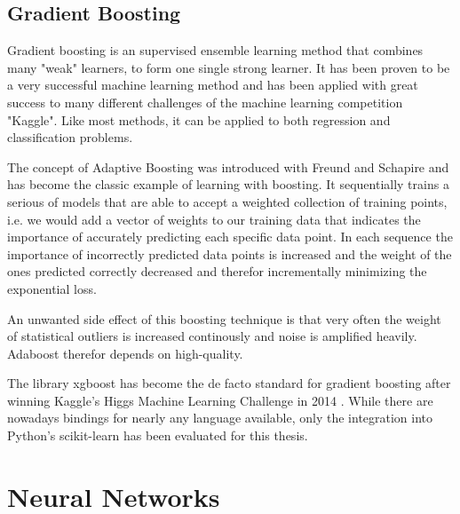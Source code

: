 




\subsection{Gradient Boosting}

Gradient boosting is an supervised ensemble learning method that combines many "weak" learners, to form one single strong learner.  It has been proven to be a very successful machine learning method and has been applied with great success to many different challenges of the machine learning competition "Kaggle". Like most methods, it can be applied to both regression and classification problems.

The concept of Adaptive Boosting was introduced with \cite{Freund97adecision-theoretic} Freund and Schapire and has become the classic example of learning with boosting. It sequentially trains a serious of models that are able to accept a weighted collection of training points, i.e. we would add a vector of weights to our training data that indicates the importance of accurately predicting each specific data point. In each sequence the importance of incorrectly predicted data points is increased and the weight of the ones predicted correctly decreased and therefor incrementally minimizing the exponential loss.

An unwanted side effect of this boosting technique is that very often the weight of statistical outliers is increased continously and noise is amplified heavily. Adaboost therefor depends on high-quality. %

The library xgboost \cite{DBLP:journals/corr/ChenG16} has become the de facto standard for gradient boosting after winning Kaggle's Higgs Machine Learning Challenge in 2014 \cite{xgboost-wins}. While there are nowadays bindings for nearly any language available, only the integration into Python's scikit-learn has been evaluated for this thesis.



\section{Neural Networks}

